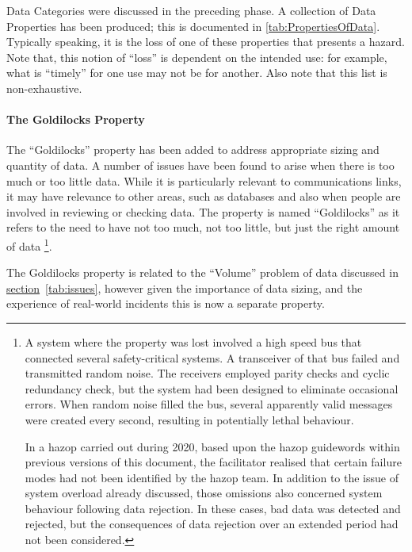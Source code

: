 Data Categories were discussed in the preceding phase. A collection of Data Properties has been produced; this is documented in \autoref{tab:PropertiesOfData}. Typically speaking, it is the loss of one of these properties that presents a hazard. Note that, this notion of ``loss'' is dependent on the intended use: for example, what is ``timely'' for one use may not be for another. Also note that this list is non-exhaustive.

\paragraph{The Goldilocks Property}\label{bkm:guidance:goldilocks}
The ``Goldilocks'' property has been added to address appropriate sizing and quantity of data. A number of issues have been found to arise when there is too much or too little data. While it is particularly relevant to communications links, it may have relevance to other areas, such as databases and also when people are involved in reviewing or checking data. The property is named ``Goldilocks'' as it refers to the need to have not too much, not too little, but just the right amount of data%
%
\footnote{A system where the property was lost involved a high speed bus that connected several safety-critical systems. A transceiver of that bus failed and transmitted random noise. The receivers employed parity checks and cyclic redundancy check, but the system had been designed to eliminate occasional errors. When random noise filled the bus, several apparently valid messages were created every second, resulting in potentially lethal behaviour.

In a \gls{hazop} carried out during 2020, based upon the \gls{hazop} guidewords within previous versions of this document, the facilitator realised that certain failure modes had not been identified by the \gls{hazop} team. In addition to the issue of system overload already discussed, those omissions also concerned system behaviour following data rejection. In these cases, bad data was detected and rejected, but the consequences of data rejection over an extended period had not been considered.}.

The Goldilocks property is related to the ``Volume'' problem of data discussed in \hyperref[tab:issues]{section}~\ref{tab:issues}, however given the importance of data sizing, and the experience of real-world incidents this is now a separate property.
%
